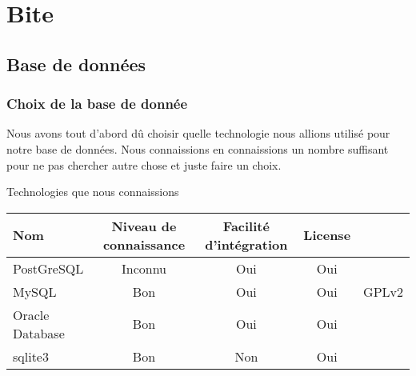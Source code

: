 \documentclass[a4paper, 11pt]{report}
\begin{document}
\chapter{Bite}
\section{Base de données}
\subsection{Choix de la base de donnée}
	Nous avons tout d'abord dû choisir quelle technologie nous allions utilisé pour notre base de données.
	Nous connaissions en connaissions un nombre suffisant pour ne pas chercher autre chose et juste faire un choix.
	\par
	\begin{center}
		Technologies que nous connaissions
		\par
		\begin{tabular}{|l|c|c|c|c|}
			\hline
			Nom & Niveau de connaissance & Facilité d'intégration & License \\
			\hline
			PostGreSQL & Inconnu & Oui & Oui\\
			\hline
			MySQL & Bon & Oui & Oui & GPLv2\\
			\hline
			Oracle Database & Bon & Oui & Oui \\
			\hline
			sqlite3 & Bon & Non & Oui \\
			\hline
		\end{tabular}
	\end{center}
\end{document}
